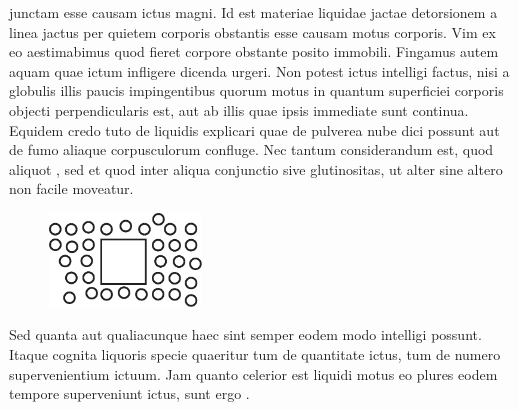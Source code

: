 junctam esse causam ictus magni. Id est materiae liquidae\protect{} jactae detorsionem a linea jactus per quietem corporis obstantis esse causam motus corporis. Vim 
ex eo aestimabimus quod fieret corpore obstante posito immobili. Fingamus autem 
%
%
aquam quae ictum infligere dicenda 
urgeri. Non potest ictus intelligi factus, nisi a globulis\protect{} illis paucis impingentibus quorum motus
in quantum superficiei corporis objecti perpendicularis est, aut ab illis quae ipsis immediate sunt continua.
Equidem credo tuto de liquidis explicari quae de pulverea nube dici possunt aut de fumo aliaque corpusculorum\protect{} confluge.
\pend
\pstart
%
%
    Nec tantum considerandum est, quod aliquot ,
sed et quod inter 
aliqua conjunctio sive glutinositas, ut alter sine altero non facile moveatur.
\begin{figure}    
    \includegraphics[trim = 0mm -5mm -8mm 0mm, clip, width=0.36\textwidth]{images/lh0351402_125-d1.pdf}
    \end{figure}
Sed quanta aut qualiacunque haec sint semper eodem modo intelligi possunt. Itaque cognita liquoris specie quaeritur tum de quantitate ictus, tum de numero 
%
%
supervenientium ictuum. Jam quanto celerior est liquidi motus eo plures eodem tempore superveniunt ictus, sunt ergo .
